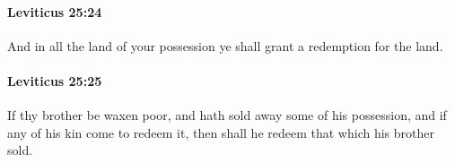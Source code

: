		\paragraph{Leviticus 25:24} %
			\label{LEVITICUS-25-24}

			And in all the land of your possession ye shall grant a redemption for the land.


		\paragraph{Leviticus 25:25} %
			\label{LEVITICUS-25-25}

			If thy brother be waxen poor, and hath sold away some of his possession, and if any of his kin come to redeem it, then shall he redeem that which his brother sold.


